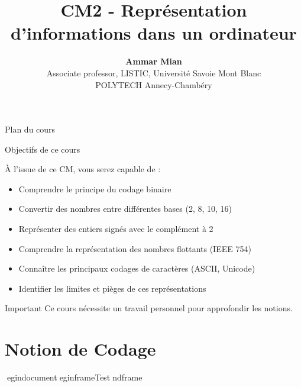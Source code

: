 \documentclass[aspectratio=1610]{beamer}
\title[CM2 - Représentation d'informations]{CM2 - Représentation d'informations dans un ordinateur}
\date[]{}
\author[AM]{\textbf{Ammar Mian} \\ \footnotesize Associate professor, LISTIC, Université Savoie Mont Blanc \\ POLYTECH Annecy-Chambéry}
\begin{document}
\begin{frame}
\titlepage
\end{frame}

\begingroup
{}
\begin{frame}{Plan du cours}
    \tableofcontents[]
\end{frame}
\endgroup



\begin{frame}{Objectifs de ce cours}

  À l'issue de ce CM, vous serez capable de :

  \begin{itemize}
    \item Comprendre le principe du codage binaire
    \item Convertir des nombres entre différentes bases (2, 8, 10, 16)
    \item Représenter des entiers signés avec le complément à 2
    \item Comprendre la représentation des nombres flottants (IEEE 754)
    \item Connaître les principaux codages de caractères (ASCII, Unicode)
    \item Identifier les limites et pièges de ces représentations
  \end{itemize}

  \vspace{1em}

  \begin{alertblock}{Important}
    Ce cours nécessite un travail personnel pour approfondir les notions.
  \end{alertblock}

\end{frame}

\section{Notion de Codage}

egin{document}egin{frame}{Test}nd{frame}
\end{document}
